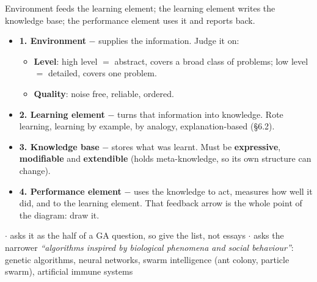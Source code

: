 {
{\color{sub}\footnotesize Environment feeds the learning element; the learning element
writes the knowledge base; the performance element uses it and reports back.}
\begin{itemize}
  \item \textbf{1. Environment} $-$ supplies the information. Judge it on:
  \begin{itemize}
    \item \textbf{Level}: high level $=$ abstract, covers a broad class of problems;
          low level $=$ detailed, covers one problem.
    \item \textbf{Quality}: noise free, reliable, ordered.
  \end{itemize}
  \item \textbf{2. Learning element} $-$ turns that information into knowledge. Rote
        learning, learning by example, by analogy, explanation-based (\S6.2).
  \item \textbf{3. Knowledge base} $-$ stores what was learnt. Must be
        \textbf{expressive}, \textbf{modifiable} and \textbf{extendible} (holds
        meta-knowledge, so its own structure can change).
  \item \textbf{4. Performance element} $-$ uses the knowledge to act, measures how well
        it did, and  to the learning element.
        That feedback arrow is the whole point of the diagram: draw it.
\end{itemize}}


{\color{sub}\footnotesize {} 
\gap$\cdot$\gap {} asks it as the  half of a GA question, so give
the list, not essays \gap$\cdot$\gap {}  asks the narrower
\emph{``algorithms inspired by biological phenomena and social behaviour''}: genetic
algorithms, neural networks, swarm intelligence (ant colony, particle swarm),
artificial immune systems}

